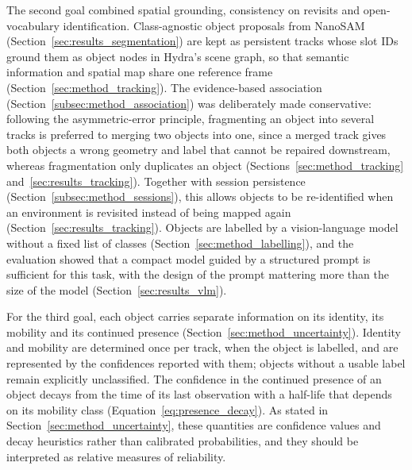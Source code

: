 {\small The second goal combined spatial grounding, consistency on revisits and open-vocabulary identification. Class-agnostic object proposals from NanoSAM (Section~\ref{sec:results_segmentation}) are kept as persistent tracks whose slot IDs ground them as object nodes in Hydra's scene graph, so that semantic information and spatial map share one reference frame (Section~\ref{sec:method_tracking}). The evidence-based association (Section~\ref{subsec:method_association}) was deliberately made conservative: following the asymmetric-error principle, fragmenting an object into several tracks is preferred to merging two objects into one, since a merged track gives both objects a wrong geometry and label that cannot be repaired downstream, whereas fragmentation only duplicates an object (Sections~\ref{sec:method_tracking} and~\ref{sec:results_tracking}). Together with session persistence (Section~\ref{subsec:method_sessions}), this allows objects to be re-identified when an environment is revisited instead of being mapped again (Section~\ref{sec:results_tracking}). Objects are labelled by a vision-language model without a fixed list of classes (Section~\ref{sec:method_labelling}), and the evaluation showed that a compact model guided by a structured prompt is sufficient for this task, with the design of the prompt mattering more than the size of the model (Section~\ref{sec:results_vlm}).\par}

{\small For the third goal, each object carries separate information on its identity, its mobility and its continued presence (Section~\ref{sec:method_uncertainty}). Identity and mobility are determined once per track, when the object is labelled, and are represented by the confidences reported with them; objects without a usable label remain explicitly unclassified. The confidence in the continued presence of an object decays from the time of its last observation with a half-life that depends on its mobility class (Equation~\ref{eq:presence_decay}). As stated in Section~\ref{sec:method_uncertainty}, these quantities are confidence values and decay heuristics rather than calibrated probabilities, and they should be interpreted as relative measures of reliability.\par}

